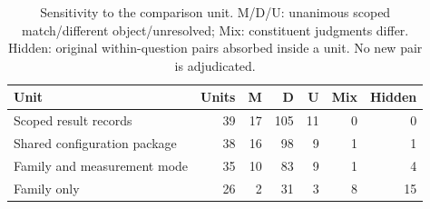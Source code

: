 \begin{table}[t]\centering\footnotesize
\caption{Sensitivity to the comparison unit. M/D/U: unanimous scoped match/different object/unresolved; Mix: constituent judgments differ. Hidden: original within-question pairs absorbed inside a unit. No new pair is adjudicated.}\label{tab:r33-granularity}
\begin{tabularx}{\columnwidth}{@{}Yrrrrrr@{}}\toprule
Unit & Units & M & D & U & Mix & Hidden\\\midrule
Scoped result records & 39 & 17 & 105 & 11 & 0 & 0\\
Shared configuration package & 38 & 16 & 98 & 9 & 1 & 1\\
Family and measurement mode & 35 & 10 & 83 & 9 & 1 & 4\\
Family only & 26 & 2 & 31 & 3 & 8 & 15\\
\bottomrule\end{tabularx}\end{table}
